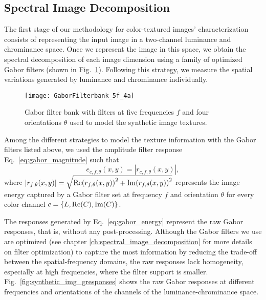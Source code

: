 \subsection{Spectral Image Decomposition}
The first stage of our methodology for color-textured images' characterization consists of representing the input image in a two-channel luminance and chrominance space. Once we represent the image in this space, we obtain the spectral decomposition of each image dimension using a family of optimized Gabor filters (shown in Fig.\ \ref{fig:gabrfilter_5f_4a}). Following this strategy, we measure the spatial variations generated by luminance and chrominance individually. 

\begin{figure}[!ht]
    \centering
    \texttt{[image: GaborFilterbank\_5f\_4a]}
    \caption{Gabor filter bank with filters at five frequencies $f$ and four orientations $\theta$ used to model the synthetic image textures.}\label{fig:gabrfilter_5f_4a}    
\end{figure}

Among the different strategies to model the texture information with the Gabor filters listed above, we used the amplitude filter response Eq.\ \eqref{eq:gabor_magnitude} such that
\begin{equation}\label{eq:gabor_energy}
	e_{c, f, \theta}(x,y) = |r_{c, f, \theta}(x,y)|,
\end{equation}
where $|r_{f, \theta}(x,y)| = \sqrt{\mathrm{Re}{(r_{f, \theta}(x, y))}^2 + \mathrm{Im}{(r_{f, \theta}(x, y))}^2}$ represents the image energy captured by a Gabor filter set at frequency $f$ and orientation $\theta$ for every color channel  $c=\{L, \mathrm{Re}(C), \mathrm{Im}(C)\}$. 

The responses generated by Eq.\ \eqref{eq:gabor_energy} represent the raw Gabor responses, that is, without any post-processing. Although the Gabor filters we use are optimized (see chapter \ref{ch:spectral_image_decomposition} for more details on filter optimization) to capture the most information by reducing the trade-off between the spatial-frequency domains, the raw responses lack homogeneity, especially at high frequencies, where the filter support is smaller. Fig.\ \ref{fig:synthetic_img_gresponses} shows the raw Gabor responses at different frequencies and orientations of the channels of the luminance-chrominance space. 

